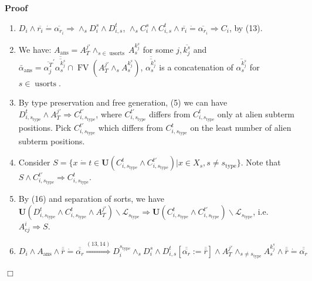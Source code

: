 \documentclass{article}
\newcommand{\assign}{:=}
\newcommand{\tmmathbf}[1]{\ensuremath{\boldsymbol{#1}}}
\newcommand{\tmop}[1]{\ensuremath{\operatorname{#1}}}
\newenvironment{proof}{\noindent\textbf{Proof\ }}{\hspace*{\fill}$\Box$\medskip}
\begin{document}
\begin{proof}
\begin{enumerate}
    \item $D_i \wedge \overline{r_i} \dot{=} \overline{\alpha_{r_i}}
    \Rightarrow \wedge_s D_i^s \wedge D_{i, s}^t$, $\wedge_s C_i^s \wedge
    C_{i, s}^t \wedge \overline{r_i} \dot{=} \overline{\alpha_{r_i}}
    \Rightarrow C_i$, by (13).
    
    \item We have: $A_{\tmop{ans}} = A_T^{j\prime} \wedge_{s \in
    \tmop{usorts}} A_s^{k_j^s}$ for some $j, \overline{k_j^s}$ and
    $\bar{\alpha}_{\tmop{ans}} = \overline{\alpha_j^T}^{\prime}
    \overline{\overline{\alpha_s^{k_j^s}}} \cap \tmop{FV} (A_T^{j\prime}
    \wedge_s A_s^{k_j^s})$, $\overline{\overline{\alpha_s^{k_j^s}}}$ is a
    concatenation of $\overline{\alpha_s^{k_j^s}}$ for $s \in \tmop{usorts}$.
    
    \item By type preservation and free generation, (5) we can have $D_{i,
    s_{\tmop{type}}}^t \wedge A_T^{j\prime} \Rightarrow C_{i,
    s_{\tmop{type}}}^{t\prime}$, where $C_{i, s_{\tmop{type}}}^{t\prime}$
    differs from $C_{i, s_{\tmop{type}}}^t$ only at alien subterm positions.
    Pick $C_{i, s_{\tmop{type}}}^{t\prime}$ which differs from $C_{i,
    s_{\tmop{type}}}^t$ on the least number of alien subterm positions.
    
    \item Consider $S = \{ x \dot{=} t \in \tmmathbf{U} (C_{i,
    s_{\tmop{type}}}^t \wedge C_{i, s_{\tmop{type}}}^{t\prime}) |x \in X_s, s
    \neq s_{\tmop{type}} \}$. Note that $S \wedge C_{i,
    s_{\tmop{type}}}^{t\prime} \Rightarrow C^t_{i, s_{\tmop{type}}}$.
    
    \item By (16) and separation of sorts, we have $\tmmathbf{U} (D_{i,
    s_{\tmop{type}}}^t \wedge C_{i, s_{\tmop{type}}}^t \wedge A_T^{j\prime})
    \backslash\mathcal{L}_{s_{\tmop{type}}} \Rightarrow \tmmathbf{U} (C_{i,
    s_{\tmop{type}}}^t \wedge C_{i, s_{\tmop{type}}}^{t\prime})
    \backslash\mathcal{L}_{s_{\tmop{type}}}$, i.e. $A^i_{c j} \Rightarrow S$.
    
    \item $D_i \wedge A_{\tmop{ans}} \wedge \overline{\bar{r}} \dot{=}
    \overline{\overline{\alpha_r}} \overset{(13, 14)}{\Longrightarrow}
    D_i^{s_{\tmop{type}}} \wedge_s D_i^s \wedge D_{i, s}^t
    [\overline{\overline{\alpha_r}} \assign \overline{\bar{r}}] \wedge
    A_T^{j\prime} \wedge_{s \neq s_{\tmop{type}}} A_s^{k_j^s} \wedge
    \overline{\bar{r}} \dot{=} \overline{\overline{\alpha_r}}$
    

\end{enumerate}
\end{proof}
\end{document}

